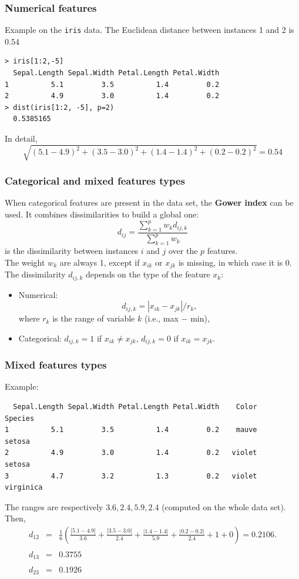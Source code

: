 \begin{frame}[fragile]
\frametitle{Numerical features}
Example on the {\tt iris} data. The Euclidean distance between instances 1 and 2 is $0.54$\\
\scriptsize
\begin{verbatim}
> iris[1:2,-5]
  Sepal.Length Sepal.Width Petal.Length Petal.Width
1          5.1         3.5          1.4         0.2
2          4.9         3.0          1.4         0.2
> dist(iris[1:2, -5], p=2)
  0.5385165
\end{verbatim}
\normalsize
In detail,
$$
\sqrt{(5.1-4.9)^2+(3.5-3.0)^2+(1.4-1.4)^2+(0.2-0.2)^2}=0.54
$$
\end{frame}
\begin{frame}
\frametitle{Categorical and mixed features types}
When categorical features are present in the data set, the {\bf Gower index} can be used. It combines dissimilarities to build a global one:
$$
d_{ij} = \frac{\sum_{k=1}^p w_k d_{ij,k}}{\sum_{k=1}^p w_k}
$$
is the dissimilarity between instances $i$ and $j$ over the $p$ features.\\
\vspace{0.2cm}
The weight $w_k$ are always 1, except if $x_{ik}$ or $x_{jk}$ is missing, in which case it is $0$. The dissimilarity $d_{ij,k}$ depends on the type of the feature $x_k$:
\begin{itemize}
\item Numerical:
$$
d_{ij,k} = |x_{ik} - x_{jk}|/r_k,
$$
where $r_k$ is the range of variable $k$ (i.e., max $-$ min),
\item Categorical: $d_{ij,k} = 1$ if $x_{ik}\neq x_{jk}$, $d_{ij,k} = 0$ if $x_{ik}= x_{jk}$.
\end{itemize}
\end{frame}
\begin{frame}[fragile]
\frametitle{Mixed features types}
Example:
\scriptsize
\begin{verbatim}
  Sepal.Length Sepal.Width Petal.Length Petal.Width    Color    Species
1          5.1         3.5          1.4         0.2    mauve     setosa
2          4.9         3.0          1.4         0.2   violet     setosa
3          4.7         3.2          1.3         0.2   violet  virginica
\end{verbatim}
\normalsize
The ranges are respectively $3.6,2.4,5.9,2.4$ (computed on the whole data set). Then,
\scriptsize
\begin{eqnarray*}
d_{12} &=& \frac{1}{6}\left(\frac{|5.1-4.9|}{3.6} + \frac{|3.5-3.0|}{2.4} + \frac{|1.4-1.4|}{5.9} + \frac{|0.2-0.2|}{2.4} + 1 + 0\right) = 0.2106.\\
\\
d_{13} &=& 0.3755\\
\\
d_{23} &=& 0.1926
\end{eqnarray*}
\end{frame}
